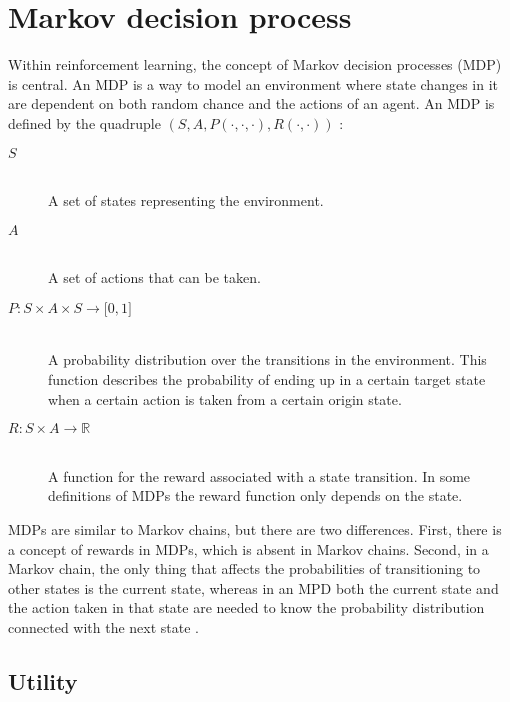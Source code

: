 \section{Markov decision process}
\label{sec:mdps}

Within reinforcement learning, the concept of Markov decision processes (MDP) is central. An MDP is a way to model an environment where state changes in it are dependent on both random chance and the actions of an agent. An MDP is defined by the quadruple $\left( S, A, P( \cdot , \cdot, \cdot ) , R( \cdot , \cdot ) \right)$ \parencite{altman2002applications}:

\begin{description}
\item[$S$] \hfill \\ 
    A set of states representing the environment.

\item[$A$] \hfill \\ 
    A set of actions that can be taken.

\item[$P \colon S \times A \times S \to \mathbb \lbrack0, 1\rbrack$] \hfill \\ 
    A probability distribution over the transitions in the environment. This
    function describes the probability of ending up in a certain target state
    when a certain action is taken from a certain origin state. 

\item[$R \colon S \times A \to \mathbb{R}$] \hfill \\ 
    A function for the reward associated with a state transition. In some
    definitions of MDPs the reward function only depends on the state.

\end{description}

MDPs are similar to Markov chains, but there are two differences. First, there
is a concept of rewards in MDPs, which is absent in Markov chains. Second, in a
Markov chain, the only thing that affects the probabilities of transitioning to
other states is the current state, whereas in an MPD both the current state and
the action taken in that state are needed to know the probability distribution
connected with the next state \parencite{altman2002applications}.

\subsection{Utility}
\label{theBestLabelEvah}
\label{sec:utility}

